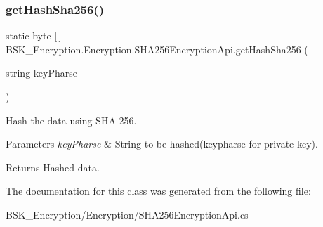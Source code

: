 \subsubsection{\texorpdfstring{get\+Hash\+Sha256()}{getHashSha256()}}
{\footnotesize\ttfamily static byte \mbox{[}$\,$\mbox{]} B\+S\+K\+\_\+\+Encryption.\+Encryption.\+S\+H\+A256\+Encryption\+Api.\+get\+Hash\+Sha256 (\begin{DoxyParamCaption}\item[{string}]{key\+Pharse }\end{DoxyParamCaption})\hspace{0.3cm}{\ttfamily [static]}}



Hash the data using S\+H\+A-\/256. 


\begin{DoxyParams}{Parameters}
{\em key\+Pharse} & String to be hashed(keypharse for private key).\\
\hline
\end{DoxyParams}
\begin{DoxyReturn}{Returns}
Hashed data.
\end{DoxyReturn}


The documentation for this class was generated from the following file\+:\begin{DoxyCompactItemize}
\item 
B\+S\+K\+\_\+\+Encryption/\+Encryption/S\+H\+A256\+Encryption\+Api.\+cs\end{DoxyCompactItemize}
